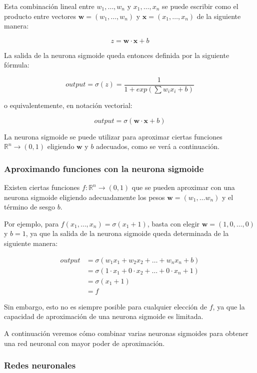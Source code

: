 \documentclass[a4paper, 10pt, twoside]{article}
\begin{document}
Esta combinación lineal entre $w_1, \ldots, w_n$ y $x_1, \ldots, x_n$ se puede
escribir como el producto entre vectores $\bm{w} = (w_1, \ldots, w_n)$ y
$\bm{x} = (x_1, \ldots, x_n)$ de la siguiente manera:

$$z = \bm{w} \cdot \bm{x} + b$$

La salida de la neurona sigmoide queda entonces definida por la siguiente
fórmula:

$$\mathit{output} = \sigma(z) = \frac{1}{1 + exp(\sum w_i x_i + b)}$$

o equivalentemente, en notación vectorial:

$$\mathit{output} = \sigma(\bm{w} \cdot \bm{x} + b)$$

La neurona sigmoide se puede utilizar para aproximar ciertas funciones
$\mathbb{R}^n \rightarrow (0, 1)$ eligiendo $\bm{w}$ y $b$ adecuados, como se
verá a continuación.


\subsubsection{Aproximando funciones con la neurona sigmoide}

Existen ciertas funciones $f : \mathbb{R}^n \rightarrow (0, 1)$ que se pueden
aproximar con una neurona sigmoide eligiendo adecuadamente los pesos $\bm{w} =
(w_1, \ldots w_n)$ y el término de sesgo $b$.

Por ejemplo, para $f(x_1, \ldots, x_n) = \sigma(x_1 + 1)$, basta con elegir
$\bm{w} = (1, 0, \ldots, 0)$ y $b = 1$, ya que la salida de la neurona sigmoide
queda determinada de la siguiente manera:

\begin{align*}
  \mathit{output} & = \sigma(w_1 x_1 + w_2 x_2 + \ldots + w_n x_n + b) \\
                  & = \sigma(1 \cdot x_1 + 0 \cdot x_2 + \ldots + 0 \cdot x_n
                             + 1) \\
                  & = \sigma(x_1 + 1) \\
                  & = f
\end{align*}

Sin embargo, esto no es siempre posible para cualquier elección de $f$, ya que
la capacidad de aproximación de una neurona sigmoide es limitada.

A continuación veremos cómo combinar varias neuronas sigmoides para obtener una
red neuronal con mayor poder de aproximación.


\subsubsection{Redes neuronales}
\end{document}

